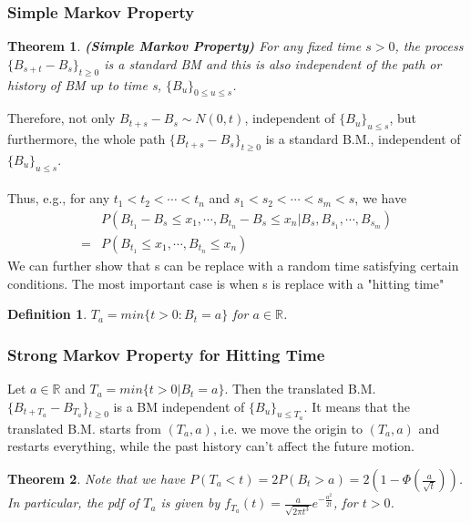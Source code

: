 \documentclass[12pt]{article}
\newtheorem{definition}{Definition}
\newtheorem{theorem}{Theorem}
\begin{document}
\subsubsection{Simple Markov Property}

\begin{theorem}
    \textbf{(Simple Markov Property)} For any fixed time $s > 0$, the process $\{B_{s+t} - B_s\}_{t\geq 0}$ is a standard BM and this is also independent of the path or history of BM up to time s, $\{B_u\}_{0\leq u \leq s}$.
\end{theorem}

\noindent Therefore, not only $B_{t+s} - B_s \sim N(0,t)$, independent of $\{B_u\}_{u \leq s}$, but furthermore, the whole path $\{B_{t+s} - B_s\}_{t\geq 0}$ is a standard B.M., independent of $\{B_u\}_{u \leq s}$.
\\
\\
\noindent Thus, e.g., for any $t_1 < t_2 < \cdots < t_n$ and $s_1 < s_2 < \cdots < s_m < s$, we have
\begin{align*}
    & P(B_{t_1} - B_s \leq x_1, \cdots, B_{t_n} - B_s \leq x_n| B_s, B_{s_1}, \cdots, B_{s_m})\\
    = & P(B_{t_1}\leq x_1, \cdots, B_{t_n}\leq x_n)
\end{align*}
We can further show that s can be replace with a random time satisfying certain conditions. The most important case is when s is replace with a "hitting time"
\begin{definition}
    $T_a = min\{ t > 0: B_t = a\}$ for $a \in \mathbb{R}$.
\end{definition}

\subsubsection{Strong Markov Property for Hitting Time}

Let $a \in \mathbb{R}$ and $T_a = min\{t > 0 | B_t = a\}$. Then the translated B.M. $\{B_{t+T_a} - B_{T_a}\}_{t\geq 0}$ is a BM independent of $\{B_u\}_{u\leq T_a}$. It means that the translated B.M. starts from $(T_a, a)$, i.e. we move the origin to $(T_a, a)$ and restarts everything, while the past history can't affect the future motion.

\begin{theorem}
    Note that we have $P(T_a < t) = 2P(B_t > a) = 2(1-\Phi(\frac{a}{\sqrt{t}}))$.
    \\In particular, the pdf of $T_a$ is given by $f_{T_a}(t)=\frac{a}{\sqrt{2\pi t^3}}e^{-\frac{a^2}{2t}}$, for $t > 0$.
\end{theorem}
\end{document}
